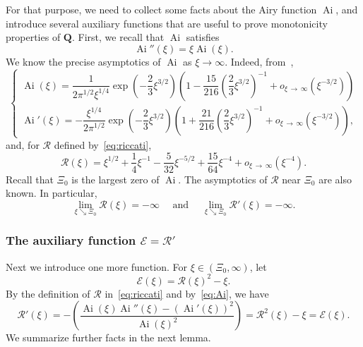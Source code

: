 \documentclass[10pt]{amsart}
\theoremstyle{definition}\newtheorem{defi}[theo]{Definition}\newtheorem{rema}[theo]{Remark}\newtheorem{exam}[theo]{Example}\newtheorem{exem}[theo]{Example}\newtheorem{nota}[theo]{Notation}
\DeclareMathOperator{\Ai}{Ai}
\newcommand{\bQ}{\mathbf{Q}}
\newcommand{\mE}{\mathcal{E}}
\newcommand{\mR}{\mathcal{R}}
\newcommand{\1}{\mathds{1}}
\begin{document}
For that purpose, we need to collect some facts about the Airy function $\Ai$, and introduce several auxiliary functions that are useful to prove monotonicity properties of $\bQ$. First, we recall that $\Ai$ satisfies
\begin{equation}\label{eq:Ai}
\Ai''(\xi)=\xi\Ai(\xi).
\end{equation}
We know the precise asymptotics of $\Ai$ as $\xi \to \infty$. Indeed, from~\cite[Equations~10.4.59, 10.4.61]{AbramowitzStegun},
\begin{equation*}
\begin{cases}
\Ai(\xi) = \dfrac{1}{2\pi^{1/2}\xi^{1/4}} \exp\left(-\dfrac23 \xi^{3/2}\right)
\left (1 - \dfrac{15}{216} \left (\dfrac23 \xi^{3/2} \right)^{-1} + o_{\xi\,\to\,\infty}\left(\xi^{-3/2} \right)\right)
\\[0.10em]
\Ai'(\xi) = -\dfrac{\xi^{1/4}}{2\pi^{1/2}} \exp\left(-\dfrac23 \xi^{3/2}\right)
\left(1 + \dfrac{21}{216} \left(\dfrac23 \xi^{3/2} \right)^{-1} + o_{\xi\,\to\,\infty}\left(\xi^{-3/2} \right)\right),
\end{cases}
\end{equation*}
and, for $\mR$ defined by~\eqref{eq:riccati},
\begin{equation}\label{eq:R asymptotics}
\mR(\xi) = \xi^{1/2} + \frac14 \xi^{-1} - \frac{5}{32}\xi^{-5/2} + \frac{15}{64 }\xi^{-4} + o_{\xi\,\to\,\infty}\left(\xi^{-4}\right).
\end{equation}
Recall that $\Xi_0$ is the largest zero of $\Ai$. The asymptotics of $\mR$ near $\Xi_0$ are also known. In particular,
\begin{equation*}
\lim_{\xi \searrow \Xi_0} \mR(\xi) = -\infty
\quad \text{ and } \quad
\lim_{\xi \searrow \Xi_0} \mR'(\xi) = -\infty.
\end{equation*}

\subsubsection{The auxiliary function \texorpdfstring{$\mE = \mR'$}{mE = mR'}} Next we introduce one more function. For $\xi\in (\Xi_0, \infty)$, let
\[
\mE(\xi) = \mR(\xi)^2 - \xi.
\]
By the definition of $\mR$ in~\eqref{eq:riccati} and by~\eqref{eq:Ai}, we have
\begin{equation}\label{eq:R' and E}
\mR'(\xi) = -\left(\frac{\Ai(\xi)\Ai''(\xi) - (\Ai'(\xi))^2}{\Ai(\xi)^2}\right) = \mR^2(\xi)-\xi= \mE(\xi).
\end{equation}
We summarize further facts in the next lemma.
\end{document}
